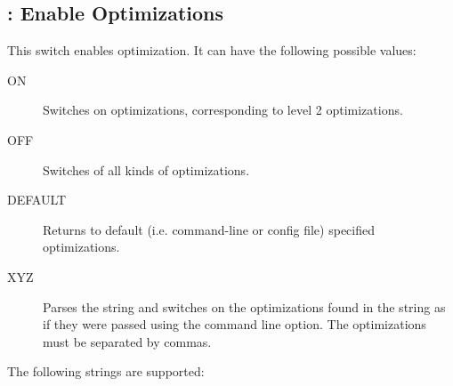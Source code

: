 \subsection{ : Enable Optimizations}
\label{switch:optimization}
This switch enables optimization. It can have the following possible values:
\begin{description}
\item[ON] Switches on optimizations, corresponding to level 2 optimizations.
\item[OFF] Switches of all kinds of optimizations.
\item[DEFAULT] Returns to default (i.e. command-line or config file) specified optimizations.
\item[XYZ] Parses the string and switches on the optimizations found in the
string as if they were passed using the  command line option.
The optimizations must be separated by commas.
\end{description}
The following strings are supported:
